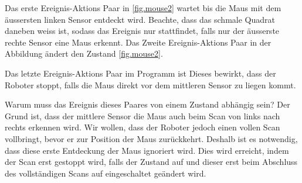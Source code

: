 Das erste Ereignis-Aktions Paar in \cref{fig.mouse2} wartet bis die Maus mit dem äussersten linken Sensor entdeckt wird. Beachte, dass das schmale Quadrat daneben weiss ist, sodass das Ereignis nur stattfindet, falls nur der äusserste rechte Sensor eine Maus erkennt. Das Zweite Ereignis-Aktions Paar in der Abbildung ändert den Zustand \cref{fig.mouse2}.

Das letzte Ereignis-Aktions Paar im Programm ist
Dieses bewirkt, dass der Roboter stoppt, falls die Maus direkt vor dem mittleren Sensor zu liegen kommt.

Warum muss das Ereignis dieses Paares von einem Zustand abhängig sein? Der Grund ist, dass der mittlere Sensor die Maus auch beim Scan von links nach rechts erkennen wird. Wir wollen, dass der Roboter jedoch einen vollen Scan vollbringt, bevor er zur Position der Maus zurückkehrt. Deshalb ist es notwendig, dass diese erste Entdeckung der Maus ignoriert wird. Dies wird erreicht, indem der Scan erst gestoppt wird, falls der Zustand auf  und dieser erst beim Abschluss des vollständigen Scans auf eingeschaltet geändert wird.


\vfill
\vfill


\vfill


